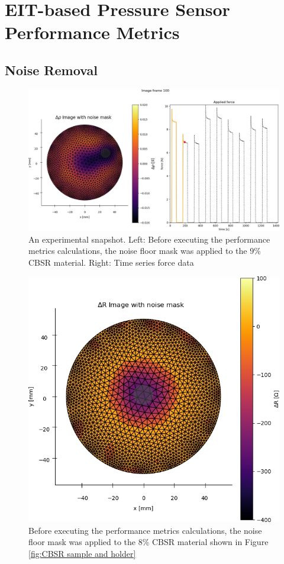 \chapter{EIT-based Pressure Sensor Performance Metrics}
\label{appendix-D}

\section{Noise Removal}
\begin{figure}[h!]
	\centering
	\includegraphics[width=\linewidth]{Figures/CBSR_9p_2_9push_25strain_60s_1mA_4_frame100_noise_mask.jpg}
	\caption{An experimental snapshot. Left: Before executing the performance metrics calculations, the noise floor mask was applied to the 9\% CBSR material. Right: Time series force data}
	\label{fig:noise_floor_mask_9p}
\end{figure}
\begin{figure}[H]
	\centering
	\includegraphics[width=0.6\linewidth]{Figures/CBSR_8p_9push_20strain_60s_4_frame20_noise_mask.jpg}
	\caption{Before executing the performance metrics calculations, the noise floor mask was applied to the 8\% CBSR material shown in Figure \ref{fig:CBSR sample and holder}}
	\label{fig:noise_floor_mask_8p}
\end{figure}


